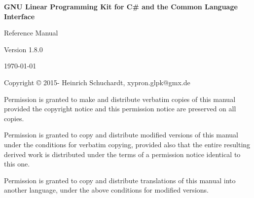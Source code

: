 \documentclass[a4paper,11pt]{report}
\newcommand{\glpkCliVersion}{1.8.0}
\begin{document}

\thispagestyle{empty}

\begin{center}

\vspace*{1in}

\begin{huge}
\sf\bfseries GNU Linear Programming Kit\linebreak
for C\# and the Common Language Interface
\end{huge}

\vspace{0.5in}

\begin{LARGE}
\sf Reference Manual
\end{LARGE}

\vspace{0.5in}

\begin{LARGE}
\sf Version \glpkCliVersion
\end{LARGE}

\vspace{0.5in}
\begin{Large}
\sf \today
\end{Large}
\end{center}

\newpage

\vspace*{1in}

\vfill

\medskip \noindent
Copyright \copyright{} 2015-{\the\year} Heinrich Schuchardt,
xypron.glpk@gmx.de

\medskip \noindent
Permission is granted to make and distribute verbatim copies of this
manual provided the copyright notice and this permission notice are
preserved on all copies.

\medskip \noindent
Permission is granted to copy and distribute modified versions of this
manual under the conditions for verbatim copying, provided also that the
entire resulting derived work is distributed under the terms of
a permission notice identical to this one.

\medskip \noindent
Permission is granted to copy and distribute translations of this manual
into another language, under the above conditions for modified versions.
\end{document}
